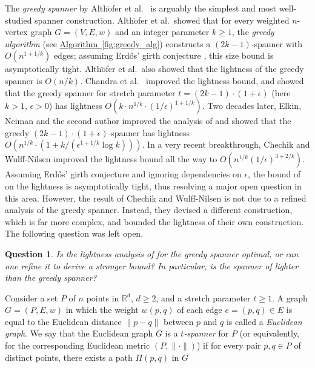 \documentclass[11pt,letterpaper]{article}
\newtheorem{question}{Question}
\newcommand{\eps}{\epsilon}
\newcommand{\namedref}[2]{\hyperref[#2]{#1~\ref*{#2}}}
\newcommand{\algref}[1]{\namedref{Algorithm}{#1}}
\begin{document}
The \emph{greedy spanner} by Alth$\ddot{\mbox{o}}$fer  et al.\ \cite{ADDJS93} is arguably the simplest and most well-studied spanner construction.    			
Alth$\ddot{\mbox{o}}$fer  et al.\ showed that for every  weighted $n$-vertex graph $G = (V,E,w)$ and an integer parameter $k \ge 1$,
the \emph{greedy algorithm} (see \algref{fig:greedy_alg}) constructs a $(2k-1)$-spanner with $O(n^{1+1/k})$ edges;
assuming Erd\H{o}s' girth conjecture \cite{erd64}, this size bound is asymptotically tight.
Alth$\ddot{\mbox{o}}$fer  et al.\ also showed that the lightness of the greedy spanner is $O(n/k)$.
Chandra et al.\ \cite{CDNS92} improved the lightness bound, and showed that the greedy spanner for stretch parameter $t=(2k-1)\cdot(1+\epsilon)$
(here $k>1$, $\epsilon>0$) has lightness $O(k \cdot n^{1/{k}} \cdot (1/\epsilon)^{1+1/k})$.
Two decades later, Elkin, Neiman and the second author \cite{ENS14} improved the analysis of \cite{CDNS92} and showed that the greedy $(2k-1)\cdot(1+\epsilon)$-spanner has lightness $O(n^{1/k}\cdot (1+ k/(\epsilon^{1+1/k}\log k)))$.
In a very recent breakthrough, Chechik and Wulff-Nilsen \cite{CW18} improved the lightness bound all the way to $O(n^{1/k} (1/\eps)^{3+2/k})$.
Assuming Erd\H{o}s' girth conjecture \cite{erd64} and ignoring dependencies on $\epsilon$, the bound of \cite{CW18} on the lightness is asymptotically tight,
thus resolving a major open question in this area. However, the result of Chechik and Wulff-Nilsen \cite{CW18}
is not due to a refined analysis of the greedy spanner. Instead, they devised a different construction, which is far more complex, and
bounded the lightness of their own construction. The following question was left open.
\begin{question} \label{question1}
	Is the lightness analysis of \cite{ENS14} for the greedy spanner optimal, or can one refine it to derive a stronger bound?
	In particular, is the spanner of \cite{CW18} lighter than the greedy spanner?
\end{question}
\vspace{2pt}
Consider a set $P$ of $n$ points in $\mathbb R^d$, $d \ge 2$, and a stretch parameter $t \ge 1$.
A graph $G = (P,E,w)$ in which the weight $w(p,q)$ of each edge $e = (p,q) \in E$
is equal to the Euclidean distance $\|p-q\|$ between $p$ and $q$ is called a \emph{Euclidean graph}.
We say that the Euclidean graph $G$ is a \emph{$t$-spanner} for $P$ (or equivalently, for the corresponding Euclidean metric $(P,\|\cdot\|)$) if for every pair $p,q \in P$ of distinct points, there exists a path $\Pi(p,q)$ in $G$
\end{document}
